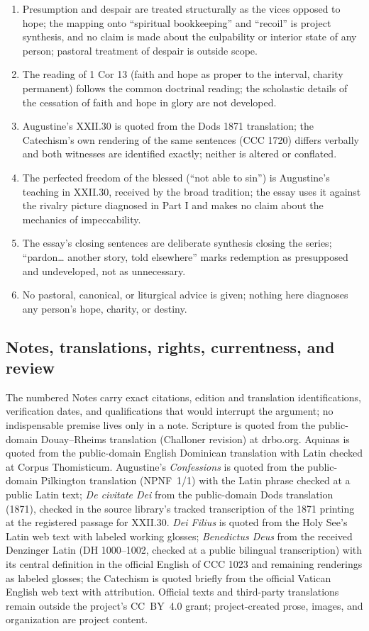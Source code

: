 \begin{enumerate}[leftmargin=1.45em,itemsep=0.25em]
\item Presumption and despair are treated structurally as the vices opposed to hope; the mapping onto ``spiritual bookkeeping'' and ``recoil'' is project synthesis, and no claim is made about the culpability or interior state of any person; pastoral treatment of despair is outside scope.
\item The reading of 1 Cor 13 (faith and hope as proper to the interval, charity permanent) follows the common doctrinal reading; the scholastic details of the cessation of faith and hope in glory are not developed.
\item Augustine's XXII.30 is quoted from the Dods 1871 translation; the Catechism's own rendering of the same sentences (CCC 1720) differs verbally and both witnesses are identified exactly; neither is altered or conflated.
\item The perfected freedom of the blessed (``not able to sin'') is Augustine's teaching in XXII.30, received by the broad tradition; the essay uses it against the rivalry picture diagnosed in Part I and makes no claim about the mechanics of impeccability.
\item The essay's closing sentences are deliberate synthesis closing the series; ``pardon\ldots{} another story, told elsewhere'' marks redemption as presupposed and undeveloped, not as unnecessary.
\item No pastoral, canonical, or liturgical advice is given; nothing here diagnoses any person's hope, charity, or destiny.
\end{enumerate}

\subsection{Notes, translations, rights, currentness, and review}

The numbered Notes carry exact citations, edition and translation identifications, verification dates, and qualifications that would interrupt the argument; no indispensable premise lives only in a note. Scripture is quoted from the public-domain Douay--Rheims translation (Challoner revision) at drbo.org. Aquinas is quoted from the public-domain English Dominican translation with Latin checked at Corpus Thomisticum. Augustine's \emph{Confessions} is quoted from the public-domain Pilkington translation (NPNF~1/1) with the Latin phrase checked at a public Latin text; \emph{De civitate Dei} from the public-domain Dods translation (1871), checked in the source library's tracked transcription of the 1871 printing at the registered passage for XXII.30. \emph{Dei Filius} is quoted from the Holy See's Latin web text with labeled working glosses; \emph{Benedictus Deus} from the received Denzinger Latin (DH 1000--1002, checked at a public bilingual transcription) with its central definition in the official English of CCC 1023 and remaining renderings as labeled glosses; the Catechism is quoted briefly from the official Vatican English web text with attribution. Official texts and third-party translations remain outside the project's CC~BY~4.0 grant; project-created prose, images, and organization are project content.

